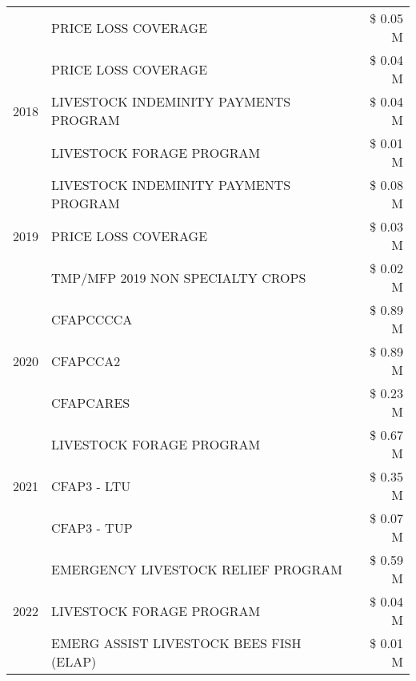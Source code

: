\begin{tabular}{llr}
 & PRICE LOSS COVERAGE & \$ 0.05 M \\
\cline{1-3}
\multirow[t]{3}{*}{2018} & PRICE LOSS COVERAGE & \$ 0.04 M \\
 & LIVESTOCK INDEMINITY PAYMENTS PROGRAM & \$ 0.04 M \\
 & LIVESTOCK FORAGE PROGRAM & \$ 0.01 M \\
\cline{1-3}
\multirow[t]{3}{*}{2019} & LIVESTOCK INDEMINITY PAYMENTS PROGRAM & \$ 0.08 M \\
 & PRICE LOSS COVERAGE & \$ 0.03 M \\
 & TMP/MFP 2019 NON SPECIALTY CROPS & \$ 0.02 M \\
\cline{1-3}
\multirow[t]{3}{*}{2020} & CFAPCCCCA & \$ 0.89 M \\
 & CFAPCCA2 & \$ 0.89 M \\
 & CFAPCARES & \$ 0.23 M \\
\cline{1-3}
\multirow[t]{3}{*}{2021} & LIVESTOCK FORAGE PROGRAM & \$ 0.67 M \\
 & CFAP3 - LTU & \$ 0.35 M \\
 & CFAP3 - TUP & \$ 0.07 M \\
\cline{1-3}
\multirow[t]{3}{*}{2022} & EMERGENCY LIVESTOCK RELIEF PROGRAM & \$ 0.59 M \\
 & LIVESTOCK FORAGE PROGRAM & \$ 0.04 M \\
 & EMERG ASSIST LIVESTOCK BEES FISH (ELAP) & \$ 0.01 M \\
\cline{1-3}
\bottomrule
\end{tabular}
